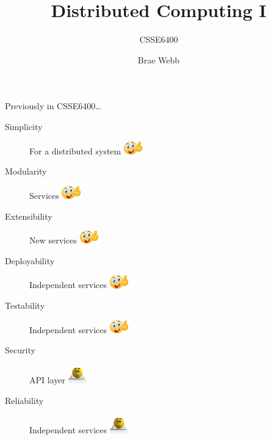 \documentclass{slide}
\title{Distributed Computing I}
\subtitle{CSSE6400}
\author{Brae Webb}
\date{\week{5}}
\begin{document}
\maketitle



\begin{frame}{Previously in CSSE6400\dots}
    \vspace{1mm}
    {\LARGE
    \begin{description}
        \item[Simplicity] For a distributed system \tabto{15em}\includegraphics[width=8mm]{../../shared/images/thumbs-up.png}
        \item[Modularity] Services \tabto{15em}\includegraphics[width=8mm]{../../shared/images/thumbs-up.png}
        \item[Extensibility] New services \tabto{15em}\includegraphics[width=8mm]{../../shared/images/thumbs-up.png}
        \item[Deployability] Independent services \tabto{15em}\includegraphics[width=8mm]{../../shared/images/thumbs-up.png}
        \item[Testability] Independent services \tabto{15em}\includegraphics[width=8mm]{../../shared/images/thumbs-up.png}
        \item[Security] API layer \tabto{15em}\includegraphics[trim=57 145 70 85,clip,width=8mm]{../../shared/images/neutral.png}
        \item[Reliability] Independent services \tabto{15em}\includegraphics[trim=57 145 70 85,clip,width=8mm]{../../shared/images/neutral.png}

\end{description}}
\end{frame}
\end{document}
